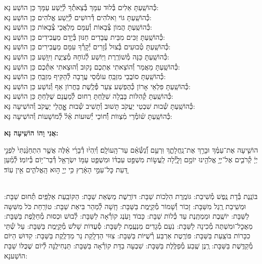 \documentclass[twoside, openany, parskip=half, 11pt]{book}
\begin{document}
\begin{small}
כְּ֯הוֹשַֽׁעְתָּ אֵלִים בְּ֯לוּד עִמָּךְ בְּ֯צֵאתְ֯ךָ לְ֯יֵֽשַׁע עַמָּךְ \hfill כֵּן הוֹשַׁע נָא: \\
כְּ֯הוֹשַֽׁעְתָּ גּוֹי וֵאלֹהִים דְּ֯רוּשִׁים לְ֯יֵֽשַׁע אֱלֹהִים \hfill כֵּן הוֹשַׁע נָא: \\
כְּ֯הוֹשַֽׁעְתָּ הֲמוֹן צְ֯בָאוֹת וְ֯עִמָּם מַלְאֲכֵי צְ֯בָאוֹת \hfill כֵּן הוֹשַׁע נָא: \\
כְּ֯הוֹשַֽׁעְתָּ זַכִּים מִבֵּית עֲבָדִים חַנּוּן בְּ֯יָדָם מַעֲבִידִים \hfill כֵּן הוֹשַׁע נָא: \\
כְּ֯הוֹשַֽׁעְתָּ טְ֯בוּעִים בְּ֯צוּל גְּ֯זָרִים יְ֯קָרְ֯ךָ עִמָּם מַעֲבִירִים \hfill כֵּן הוֹשַׁע נָא: \\
כְּ֯הוֹשַֽׁעְתָּ כַּנָּה מְ֯שׁוֹרֶֽרֶת וַיּֽוֹשַׁע לְ֯גוֹחָהּ מְ֯צֻיֶּנֶת וַיִוָּֽשַׁע \hfill כֵּן הוֹשַׁע נָא: \\
כְּ֯הוֹשַֽׁעְתָּ מַאֲמַר וְ֯הוֹצֵאתִי אֶתְכֶם נָקוּב וְ֯הוּצֵאתִי אִתְּ֯כֶם \hfill כֵּן הוֹשַׁע נָא:\\
כְּ֯הוֹשַֽׁעְתָּ סוֹבֲבֵי מִזְבֵּֽחַ עוֹמְ֯סֵי עֲרָבָה לְ֯הַקִּיף מִזְבֵּֽחַ \hfill כֵּן הוֹשַׁע נָא: \\
כְּ֯הוֹשַֽׁעְתָּ פִּלְאֵי אָרוֹן כְּ֯הֻפְשַׁע צִעֵר פְּ֯לֶֽשֶׁת בַּחֲרוֹן אַף וְ֯נוֹשַׁע \hfill כֵּן הוֹשַׁע נָא:\\
כְּ֯הוֹשַֽׁעְתָּ קְ֯הִלּוֹת בָּבֶֽלָה שִׁלַּֽחְתָּ רַחוּם לְ֯מַעֲנָם שֻׁלַּחְתָּ \hfill כֵּן הוֹשַׁע נָא:\\

כְּ֯הוֹשַֽׁעְתָּ שְׁ֯בוּת שִׁבְטֵי יַעֲקֹב תָּשׁוּב וְ֯תָשִׁיב שְׁ֯בוּת אׇׇׇׇהֳלֵי יַעֲקֹב \hfill וְ֯הוֹשִׁיעָה נָּא:\\
כְּ֯הוֹשַֽׁעְתָּ שׁ֗וֹמְ֯רֵי מִ֗צְווֹת וְ֯֗חוֹכֵי יְ֯שׁוּעוֹת אֵ֗ל֗ לְ֯מוֹשָׁעוֹת \hfill וְ֯הוֹשִׁיעָה נָּא:

\end{small}

\begin{large}
\textbf{אֲנִי וָהוֹ הוֹשִֽׁיעָה נָּא:}
\end{large}

הוֹשִׁ֤יעָה אֶת־עַמֶּ֗ךָ וּבָרֵ֥ךְ אֶת־נַֽחֲלָתֶ֑ךָ וּֽרְעֵ֥ם וְ֯֝נַשְּׂ֯אֵ֗ם עַד־הָֽעוֹלָֽם׃ וְ֯יִֽהְי֨וּ דְ֯בָרַ֜י אֵ֗לֶּה אֲשֶׁ֤ר הִתְחַנַּ֨נְתִּי֙ לִפְנֵ֣י יְיָ֔ קְ֯רֹבִ֛ים אֶל־יְיָ֥ אֱלֹהֵ֖ינוּ יוֹמָ֣ם וָלָ֑יְ֯לָה לַֽעֲשׂ֣וֹת מִשְׁפַּ֣ט עַבְדּ֗וֹ וּמִשְׁפַּ֛ט עַמּ֥וֹ יִשְׂרָאֵ֖ל דְּ֯בַר־י֥וֹם בְּ֯יוֹמֽוֹ׃ לְ֯מַ֗עַן דַּ֚עַת כׇּל־עַמֵּ֣י הָאָ֔רֶץ כִּ֥י יְיָ֖ ה֣וּא הָֽאֱלֹהִ֑ים אֵ֖ין עֽוֹד׃

\sepline

\\
בּוֹנֶֽנֶת בְּ֯דָת נֶֽפֶשׁ מְ֯שִׁיבַת: גּוֹמֶֽרֶת הִלְכוֹת שַׁבָּת: דּוֹרֶֽשֶׁת מַשְׂאַת שַׁבָּת: הַקּוֹבַֽעַת אַלְפַּֽיִם תְּ֯חוּם שַׁבָּת: וּמְשִֽׁיבַת רֶֽגֶל מִשַּׁבָּת: זָכוֹר וְ֯שָׁמוֹר מְ֯קַיֶּֽמֶת בַּשַּׁבָּת: חָֽשָׁה לְ֯מַהֵר בִּיאַת שַׁבָּת: טוֹרַֽחַת כֹּל מִשִּׁשָּה לַשַּׁבָּת: יוֹשֶֽׁבֶת וּמַמְתֶּֽנֶת עַד כְּ֯לוֹת שַׁבָּת: כָּבוֹד וָעֹֽנֶג קוֹרְ֯אָה לַשַּׁבָּת: לְ֯בוּשׁ וּכְסוּת מְ֯חַלֶּֽפֶת בַּשַּׁבָּת: מַאֲכׇל־וּמִשְׁתֶּה מְ֯כִינָה לַשַּׁבָּת: נֹֽעַם מְ֯גָדִים מַנְעֶֽמֶת לַשַּׁבָּת: סְ֯עֻדּוֹת שָׁלֹשׁ מְ֯קַיֶּֽמֶת בַּשַּׁבָּת: עַל שְׁ֯תֵּי כִכָּרוֹת בּוֹצַֽעַת בַּשַּׁבָּת: פּוֹרֶֽטֶת אַרְבַּע רְ֯שֻׁיּוֹת בַּשַּׁבָּת: צִוּוּי הַדְלָֽקַת נֵר מַדְלֶֽקֶת בַּשַּׁבָּת: קִדּוּשׁ הַיּוֹם מְ֯קַדֶּֽשֶׁת בַּשַּׁבָּת: רֶֽנֶן שֶֽׁבַע מְ֯פַלֶּֽלֶת בַּשַּׁבָּת: שִׁבְעָה בַדָּת קוֹרְ֯אָה בַּשַּׁבָּת: תַּנְחִילֶֽנָּה לְ֯יוֹם שֶׁכֻּלּוֹ שַׁבָּת הוֹשַׁענָא:
\end{document}
